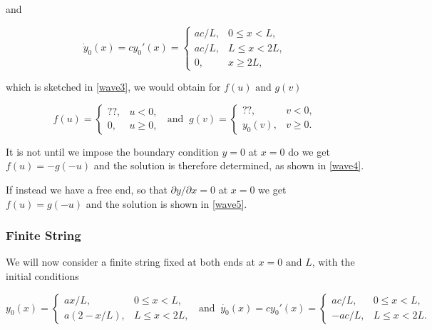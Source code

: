 \documentclass[a4paper,12pt]{report}
\begin{document}
and

\begin{equation}
	\dot{y}_0(x) = c y_0'(x) =
\begin{cases}
    ac /L,& 0 \leq x < L, \\
    ac /L,& L \leq x < 2L, \\
    0,& x \geq 2L,
\end{cases}
\end{equation}

which is sketched in \cref{wave3}, we would obtain for \(f(u) \text { and }  g(v)\) 

\begin{equation}
	f(u) = \begin{cases}
		??,& u<0,\\
		0,& u \ge 0,
	\end{cases} ~\text { and }~ g(v) = \begin{cases}
		??,& v<0,\\
		y_0 (v),& v \ge 0.
	\end{cases}
\end{equation}


It is not until we impose the boundary condition \(y= 0 \) at \(x=0\) do we get \(f(u) = -g(-u)\) and the solution is therefore determined, as shown in \cref{wave4}.


If instead we have a free end, so that \(\partial y /\partial x = 0\) at \(x = 0\) we get \(f(u) = g(-u)\) and the solution is shown in \cref{wave5}.   


\subsubsection{Finite String}

We will now consider a finite string fixed at both ends at \(x= 0 \text { and } L\), with the initial conditions

\begin{equation}
	y_0 (x) = \begin{cases}
		ax /L,& 0 \le x < L,\\
		a(2-x /L),& L \le x <2L,
	\end{cases} ~\text { and }~ \dot{y_0 }(x) = cy_0'(x) = \begin{cases}
		ac /L,& 0 \le x<L,\\
		-ac /L,& L \le x <2L.
	\end{cases} 
\end{equation}
\end{document}
